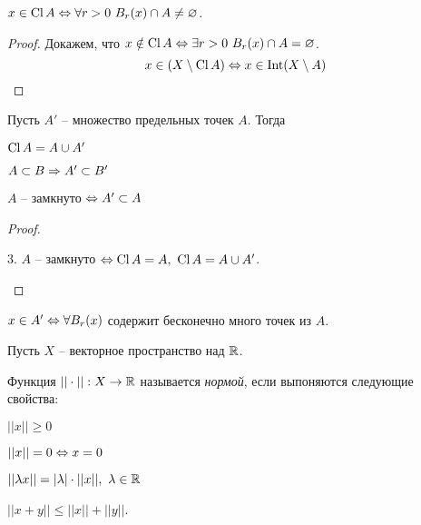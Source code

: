     \begin{Thm}
        $x \in \operatorname{Cl} A \Leftrightarrow \forall r > 0 \ B_r(x) \cap A \neq \varnothing$. 
    \end{Thm}

    \begin{proof}
        Докажем, что $x \notin \operatorname{Cl} A \Leftrightarrow \exists r > 0 \ B_r(x) \cap A = \varnothing$.
        \[x \in \left(X \setminus \operatorname{Cl} A\right) \Leftrightarrow x \in \operatorname{Int} (X \setminus A)\]
    \end{proof}

    Пусть $A'$ -- множество предельных точек $A$. Тогда
    \begin{Thm}[Свойства]
        \begin{MyList}
            \item $\operatorname{Cl} A = A \cup A'$ 
            \item $A \subset B \Rightarrow A' \subset B'$ 
            \item $A$ -- замкнуто $\Leftrightarrow A' \subset A$
        \end{MyList}
    \end{Thm}

    \begin{proof}
        \begin{MyList}
            \item[3.] $A$ -- замкнуто $\Leftrightarrow \operatorname{Cl} A = A, \ \operatorname{Cl} A = A \cup A'$.
        \end{MyList}
    \end{proof}

    \begin{Thm}
        $x \in A' \Leftrightarrow \forall B_r(x)$ содержит бесконечно много точек из $A$.
    \end{Thm}


    Пусть $X$ -- векторное пространство над $\mathbb{R}$.
    \begin{Def}[Норма]
        Функция $||\cdot|| : X \to \mathbb{R}$ называется \textit{нормой}, если выпоняются следующие свойства:
        \begin{MyList}
            \item $||x|| \geqslant 0$
            \item[] $||x|| = 0 \Leftrightarrow x = 0$
            \item $||\lambda x|| = |\lambda| \cdot ||x||, \ \lambda \in \R$
            \item $||x + y|| \leqslant ||x|| + ||y||$.  
        \end{MyList}
    \end{Def}

